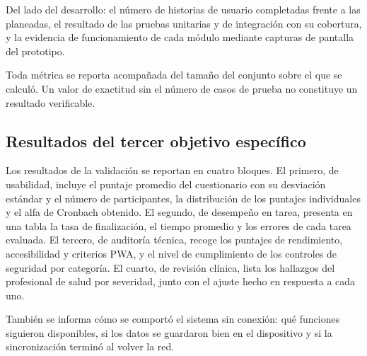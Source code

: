\documentclass[conference]{IEEEtran}
\begin{document}
Del lado del desarrollo: el número de historias de usuario completadas frente a las planeadas, el resultado de las pruebas unitarias y de integración con su cobertura, y la evidencia de funcionamiento de cada módulo mediante capturas de pantalla del prototipo.

Toda métrica se reporta acompañada del tamaño del conjunto sobre el que se calculó. Un valor de exactitud sin el número de casos de prueba no constituye un resultado verificable.

\subsection{Resultados del tercer objetivo específico}
Los resultados de la validación se reportan en cuatro bloques. El primero, de usabilidad, incluye el puntaje promedio del cuestionario con su desviación estándar y el número de participantes, la distribución de los puntajes individuales y el alfa de Cronbach obtenido. El segundo, de desempeño en tarea, presenta en una tabla la tasa de finalización, el tiempo promedio y los errores de cada tarea evaluada. El tercero, de auditoría técnica, recoge los puntajes de rendimiento, accesibilidad y criterios PWA, y el nivel de cumplimiento de los controles de seguridad por categoría. El cuarto, de revisión clínica, lista los hallazgos del profesional de salud por severidad, junto con el ajuste hecho en respuesta a cada uno.

También se informa cómo se comportó el sistema sin conexión: qué funciones siguieron disponibles, si los datos se guardaron bien en el dispositivo y si la sincronización terminó al volver la red.
\end{document}
